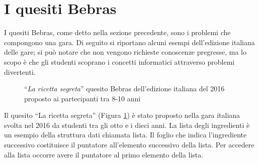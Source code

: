 \documentclass[12pt]{report}
\begin{document}
%
%
\section{I quesiti Bebras}

I quesiti Bebras, come detto nella sezione precedente, sono i problemi che compongono una gara.
Di seguito si riportano alcuni esempi dell'edizione italiana delle gare; si può notare che non vengono richieste conoscenze pregresse, ma lo scopo è che gli studenti scoprano i concetti informatici attraverso problemi divertenti.

\begin{figure}[H]
	\centering
	\caption{ ``\textit{La ricetta segreta}'' quesito Bebras dell'edizione italiana del 2016 proposto ai partecipanti tra 8-10 anni}\label{fig:ricetta}
\end{figure}

Il quesito ``La ricetta segreta'' (Figura \ref{fig:ricetta}) è stato proposto nella gara italiana svolta nel 2016 da studenti tra gli otto e i dieci anni.
La lista degli ingredienti è un esempio della struttura dati chiamata lista. Il foglio che indica l'ingrediente successivo costituisce il puntatore all'elemento successivo della lista. Per accedere alla lista occorre avere il puntatore al primo elemento della lista.
\end{document}
